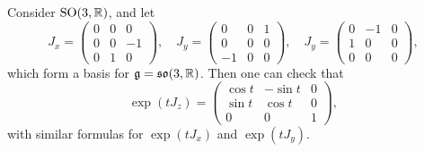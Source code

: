 \begin{example}
  Consider $\operatorname{SO}(3, \mathbb{R})$, and let
  \[
    J_x =
    \begin{pmatrix}
      0 & 0 & 0 \\
      0 & 0 & -1 \\
      0 & 1 & 0
    \end{pmatrix}, \quad
    J_y =
    \begin{pmatrix}
      0 & 0 & 1 \\
      0 & 0 & 0 \\
      -1 & 0 & 0
    \end{pmatrix}, \quad
    J_y =
    \begin{pmatrix}
      0 & -1 & 0 \\
      1 & 0 & 0 \\
      0 & 0 & 0
    \end{pmatrix},
  \]
  which form a basis for
  $\mathfrak{g} = \mathfrak{so}(3, \mathbb{R})$.
  Then one can check that
  \[
    \exp(t J_z) =
    \begin{pmatrix}
      \cos t & -\sin t & 0 \\
      \sin t & \cos t & 0 \\
      0 & 0 & 1
    \end{pmatrix},
  \]
  with similar formulas
  for $\exp(t J_x)$ and $\exp(t J_y)$.
\end{example}

